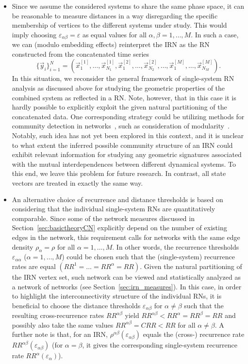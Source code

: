 \begin{itemize}

\item Since we assume the considered systems to share the same phase space, it can be reasonable to measure distances in a way disregarding the specific membership of vertices to the different systems under study. This would imply choosing $\varepsilon_{\alpha\beta}=\varepsilon$ as equal values for all $\alpha,\beta=1,\dots,M$. In such a case, we can (modulo embedding effects) reinterpret the IRN as the RN constructed from the concatenated time series
$$\{\vec{y}_i\}_{i=1}^N=(\vec{x}_1^{[1]},\dots,\vec{x}_{N_1}^{[1]},\vec{x}_1^{[2]},\dots,\vec{x}_{N_2}^{[2]},\dots,\vec{x}_1^{[M]},\dots,\vec{x}_{N_M}^{[M]}).$$
In this situation, we reconsider the general framework of single-system RN analysis as discussed above for studying the geometric properties of the combined system as reflected in a RN. Note, however, that in this case it is hardly possible to explicitly exploit the given natural partitioning of the concatenated data. One corresponding strategy could be utilizing methods for community detection in networks~\cite{Fortunato2010}, such as consideration of modularity~\cite{Newman2004}. Notably, such idea has not yet been explored in this context, and it is unclear to what extent the inferred possible community structure of an IRN could exhibit relevant information for studying any geometric signatures associated with the mutual interdependences between different dynamical systems. To this end, we leave this problem for future research. In contrast, all state vectors are treated in exactly the same way.

\item An alternative choice of recurrence and distance thresholds is based on considering that the individual single-system RNs are quantitatively comparable. Since some of the network measures discussed in Section~\ref{sec:basictheoryCN} explicitly depend on the number of existing edges in the network, this requirement calls for networks with the same edge density $\rho_\alpha=\rho$ for all $\alpha=1,\dots,M$. In other words, the recurrence thresholds $\varepsilon_{\alpha\alpha}$ ($\alpha=1,\dots,M$) could be chosen such that the (single-system) recurrence rates are equal $(RR^1=\dots=RR^\alpha=RR)$. Given the natural partitioning of the IRN vertex set, such network can be viewed and statistically analyzed as a network of networks (see Section~\ref{sec:irn_measures}). In this case, in order to highlight the interconnectivity structure of the individual RNs, it is beneficial to choose the distance thresholds $\varepsilon_{\alpha\beta}$ for $\alpha\neq \beta$ such that the resulting cross-recurrence rates $RR^{\alpha\beta}$ yield $RR^{\alpha\beta}<RR^\alpha=RR^\beta=RR$ and possibly also take the same values $RR^{\alpha\beta}=CRR<RR$ for all $\alpha\neq \beta$. A further note is that, for an IRN, ${\rho}^{\alpha\beta}(\varepsilon_{\alpha\beta})$ equals the (cross-) recurrence rate $RR^{\alpha\beta}(\varepsilon_{\alpha\beta})$ (for $\alpha=\beta$, it gives the corresponding single-system recurrence rate $RR^\alpha(\varepsilon_\alpha)$).

\end{itemize}

